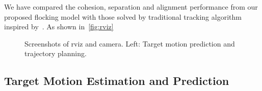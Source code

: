 We have compared the cohesion, separation and alignment performance from our proposed flocking model with those solved by traditional tracking algorithm inspired by~\cite{Chenjing}. As shown in~\ref{fig:rviz}

\begin{figure}[htb]
  \centering
  \caption{Screenshots of rviz and camera. Left: Target motion prediction and trajectory planning.}\label{fig:rviz_capture}
\end{figure}

\subsection{Target Motion Estimation and Prediction}


